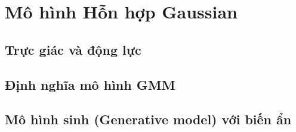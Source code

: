 
\section{Mô hình Hỗn hợp Gaussian}
\label{sec:gmm}

\subsection{Trực giác và động lực}



\subsection{Định nghĩa mô hình GMM}



\subsection{Mô hình sinh (Generative model) với biến ẩn}





